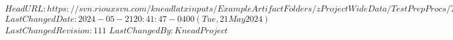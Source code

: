 \svnidlong
{$HeadURL: https://svn.riouxsvn.com/kneadlatxinputs/ExampleArtifactFolders/zProjectWideData/TestPrepProcs/TestCasePrep_AllRecords.tex $}
{$LastChangedDate: 2024-05-21 20:41:47 -0400 (Tue, 21 May 2024) $}
{$LastChangedRevision: 111 $}
{$LastChangedBy: KneadProject $}








